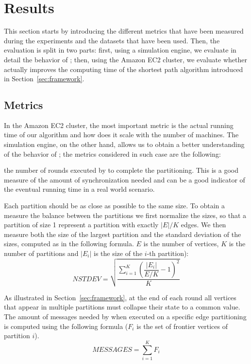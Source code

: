 \section{Results} \label{sec:results}

This section starts by introducing the different metrics that have been
measured during the experiments and the datasets that have been used. Then, the
evaluation is split in two parts: first, using a simulation engine, we evaluate
in detail the behavior of \dfep; then, using the Amazon EC2 cluster, we
evaluate whether \etsch actually improves the computing time of the shortest
path algorithm introduced in Section~\ref{sec:framework}.

\subsection{Metrics}

In the Amazon EC2 cluster, the most important metric is the actual running time
of our algorithm and how does it scale with the number of machines. The simulation
engine, on the other hand, allows us to obtain a better understanding of the
behavior of \dfep; the metrics considered in such case are the following:

 the number of rounds executed by \dfep to complete
the partitioning. This is a good measure of the amount of synchronization
needed and can be a good indicator of the eventual running time in a real world
scenario.

 Each partition should be as close as possible to the same 
size. To obtain a measure the balance between the partitions we first normalize 
the sizes, so that a partition of size 1 represent a partition with exactly $|E| / 
K$ edges. We then measure both the size of the largest partition and the standard 
deviation of the sizes, computed as in the following formula. $E$ is the number of 
vertices, $K$ is the number of partitions and $|E_i|$ is the size of the $i$-th 
partition):
$$\mathit{NSTDEV} = \sqrt{ \dfrac{\sum_{i=1}^K{(\dfrac{|E_i|}{E/K}-1)^2}}{K}}$$

 As illustrated in Section~\ref{sec:framework}, at
the end of each round all vertices that appear in multiple partitions must
collapse their state to a common value. The amount of messages needed by \etsch
when executed on a specific edge partitioning is computed using the following
formula ($F_i$ is the set of frontier vertices of partition $i$).
$$\mathit{MESSAGES} = \sum_{i=1}^K {F_i}$$

